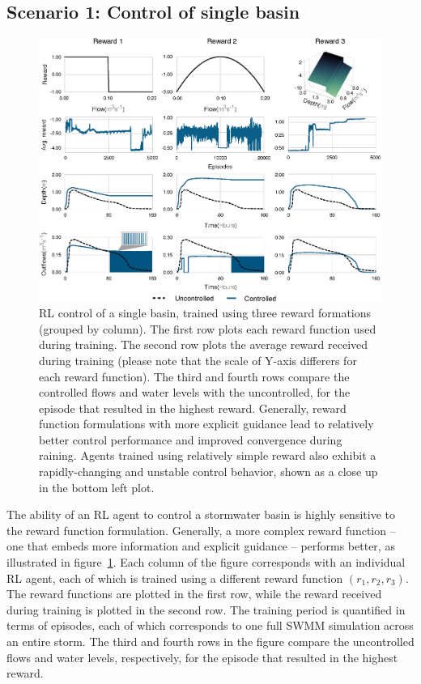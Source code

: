 \subsection{Scenario 1: Control of single basin}

\begin{figure}
    \centering
    \includegraphics[width=\textwidth]{gfx/Chapter-3/single_pond.eps}
    \caption{RL control of a single basin, trained using three reward formations (grouped by column). The first row plots each reward function used during training. The second row plots the average reward received during training (please note that the scale of Y-axis differers for each reward function). The third and fourth rows compare the controlled flows and water levels with the uncontrolled, for the episode that resulted in the highest reward. Generally, reward function formulations with more explicit guidance lead to relatively better control performance and improved convergence during raining. Agents trained using relatively simple reward also exhibit a rapidly-changing and unstable control behavior, shown as a close up in the bottom left plot.}\label{fig:3}
\end{figure}



The ability of an RL agent to control a stormwater basin is highly sensitive to the reward function formulation.
Generally, a more complex reward function -- one that embeds more information and explicit guidance -- performs better, as illustrated in figure~\ref{fig:3}.
Each column of the figure corresponds with an individual RL agent, each of which is trained using a different reward function $(r_1,r_2,r_3)$.
The reward functions are plotted in the first row, while the reward received during training is plotted in the second row.
The training period is quantified in terms of episodes, each of which corresponds to one full SWMM simulation across an entire storm.
The third and fourth rows in the figure compare the uncontrolled flows and water levels, respectively, for the episode that resulted in the highest reward.

